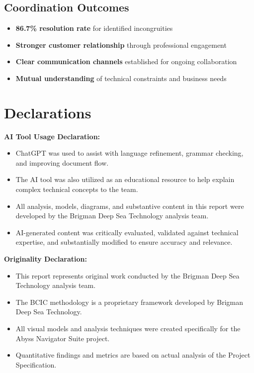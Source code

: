 \documentclass[12pt,a4paper]{article}
\begin{document}
\subsection{Coordination Outcomes}
\begin{itemize}
\item \textbf{86.7\% resolution rate} for identified incongruities
\item \textbf{Stronger customer relationship} through professional engagement
\item \textbf{Clear communication channels} established for ongoing collaboration
\item \textbf{Mutual understanding} of technical constraints and business needs
\end{itemize}

\newpage

\section{Declarations}
\label{sec:declarations}

\textbf{AI Tool Usage Declaration:}
\begin{itemize}
\item ChatGPT was used to assist with language refinement, grammar checking, and improving document flow.
\item The AI tool was also utilized as an educational resource to help explain complex technical concepts to the team.
\item All analysis, models, diagrams, and substantive content in this report were developed by the Brigman Deep Sea Technology analysis team.
\item AI-generated content was critically evaluated, validated against technical expertise, and substantially modified to ensure accuracy and relevance.
\end{itemize}

\textbf{Originality Declaration:}
\begin{itemize}
\item This report represents original work conducted by the Brigman Deep Sea Technology analysis team.
\item The BCIC methodology is a proprietary framework developed by Brigman Deep Sea Technology.
\item All visual models and analysis techniques were created specifically for the Abyss Navigator Suite project.
\item Quantitative findings and metrics are based on actual analysis of the Project Specification.
\end{itemize}
\end{document}
